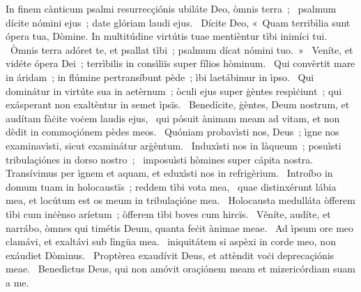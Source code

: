 { In finem cànticum psalmi resurrecçiónis}
{%
ubiláte Deo, òmnis terra~; 
~psalmum dícite nómini ejus~; date glóriam laudi ejus. 
~Dícite Deo, «~Quam terribìlia sunt ópera tua, Dòmine. In multitúdine virtútis tuae mentièntur tìbi inimíci tui. 
~Òmnis terra adóret te, et psallat tìbi~; psalmum dícat nómini tuo.~»
~Veníte, et vidéte ópera Dei~; terrìbilis in consìliïs super fílios hòminum. 
~Qui convèrtit mare in áridam~; in flúmine pertransíbunt pède~; ìbi laetábimur in ìpso. 
~Qui dominátur in virtúte sua in aetèrnum~; òculi ejus super ġèntes respìċiunt~; qui exásperant non exaltèntur in semet ìpsïs. 
~Benedícite, ġèntes, Deum nostrum, et audítam fàċite voċem laudis ejus, 
~qui pósuit ànimam meam ad vitam, et non dèdit in commoçiónem pèdes meos. 
~Quóniam probavìsti nos, Deus~; ìgne nos examinavìsti, sicut examinátur arġèntum. 
~Induxìsti nos in làqueum~; posuìsti tribulaçiónes in dorso nostro~; 
~imposuìsti hòmines super cápita nostra. Transívimus per ìgnem et aquam, et eduxìsti nos in refrigèrium. 
~Introíbo in domum tuam in holocaustïs~; reddem tìbi vota mea, 
~quae distinxérunt lábia mea, et locútum est os meum in tribulaçióne mea. 
~Holocausta medulláta òfferem tìbi cum inċènso aríetum~; òfferem tìbi boves cum hircïs. 
~Věníte, audíte, et narrábo, òmnes qui timétis Deum, quanta feċit ànimae meae. 
~Ad ìpsum ore meo clamávi, et exaltávi sub lìngüa mea. 
~iniquitátem si aspèxi in corde meo, non exáudiet Dòminus. 
~Proptèrea exaudívit Deus, et attèndit voċi deprecaçiónis meae. 
~Benedìctus Deus, qui non amóvit oraçiónem meam et mizericórdiam suam a me. 
}
